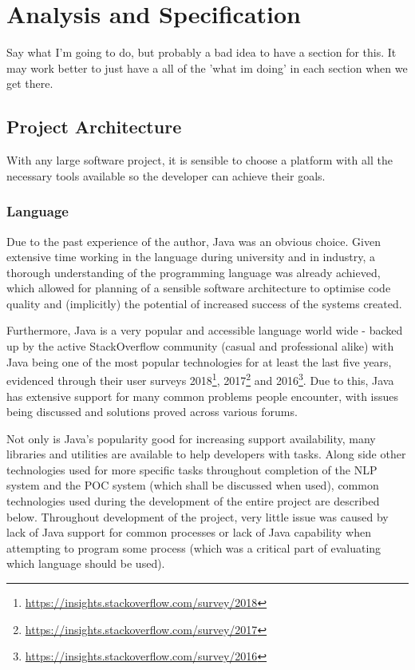 \chapter{Analysis and Specification}
Say what I'm going to do, but probably a bad idea to have a section for this. It may work better to just have a all of the 'what im doing' in each section when we get there.

\section{Project Architecture}
With any large software project, it is sensible to choose a platform with all the necessary tools available so the developer can achieve their goals. 

\subsection{Language}
Due to the past experience of the author, Java was an obvious choice. Given extensive time working in the language during university and in industry, a thorough understanding of the programming language was already achieved, which allowed for planning of a sensible software architecture to optimise code quality and (implicitly) the potential of increased success of the systems created. 

Furthermore, Java is a very popular and accessible language world wide - backed up by the active StackOverflow community (casual and professional alike) with Java being one of the most popular technologies for at least the last five years, evidenced through their user surveys 2018\footnote{\href{https://insights.stackoverflow.com/survey/2018}{https://insights.stackoverflow.com/survey/2018}}, 2017\footnote{\href{https://insights.stackoverflow.com/survey/2017}{https://insights.stackoverflow.com/survey/2017}} and 2016\footnote{\href{https://insights.stackoverflow.com/survey/2016}{https://insights.stackoverflow.com/survey/2016}}. Due to this, Java has extensive support for many common problems people encounter, with issues being discussed and solutions proved across various forums. 

Not only is Java's popularity good for increasing support availability, many libraries and utilities are available to help developers with tasks. Along side other technologies used for more specific tasks throughout completion of the NLP system and the POC system (which shall be discussed when used), common technologies used during the development of the entire project are described below. Throughout development of the project, very little issue was caused by lack of Java support for common processes or lack of Java capability when attempting to program some process (which was a critical part of evaluating which language should be used). 

